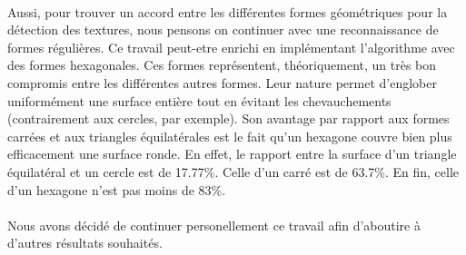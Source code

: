\paragraph*{}
Aussi, pour trouver un accord entre les différentes formes géométriques pour la détection des textures, nous pensons on continuer avec une reconnaissance de formes régulières. Ce travail peut-etre enrichi en implémentant l'algorithme avec des formes hexagonales. 
Ces formes représentent, théoriquement, un très bon compromis entre les différentes autres formes. Leur nature permet d'englober uniformément une surface entière tout en évitant les chevauchements (contrairement aux cercles, par exemple). Son avantage par rapport aux formes carrées et aux triangles équilatérales est le fait qu'un hexagone couvre bien plus efficacement une surface ronde. En effet, le rapport entre la surface d'un triangle équilatéral et un cercle est de 17.77\%. Celle d'un carré est de 63.7\%. En fin, celle d'un hexagone n'est pas moins de 83\%.

\paragraph*{}
Nous avons décidé de continuer personellement ce travail afin d'aboutire à d'autres résultats souhaités.



